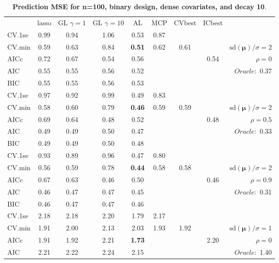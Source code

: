 \clearpage
\begin{table}\vspace{-.5cm}
\caption[l]{ { \bf Prediction MSE for n=100, binary design, 
dense covariates, and  decay  10}.}
\vspace{-.5cm}
\footnotesize{}
\begin{center}
\begin{tabular}{l*{7}{c}|r}
 & lasso & GL $\gamma=1$ & GL $\gamma=10$ & AL & MCP  & CVbest & ICbest  \\
\cline{1-9}
CV.1se & 0.99 & 0.94 & 1.06 & 0.53 & 0.87 & & & \\
CV.min & 0.59 & 0.63 & 0.84 & {\bf 0.51} & 0.62 & 0.61 & & $\mathrm{sd}(\mathbf{\mu})/\sigma=2$ \\
AICc & 0.72 & 0.67 & 0.54 & 0.56 & & & 0.54 &  $\rho=0$ \\
AIC & 0.55 & 0.55 & 0.56 & 0.52 & & & &  \multirow{2}{*}{$Oracle: $ 0.37} \\
BIC & 0.55 & 0.55 & 0.56 & 0.53 & & & &  \\
 \hline 
CV.1se & 0.97 & 0.92 & 0.99 & 0.49 & 0.83 & & & \\
CV.min & 0.58 & 0.60 & 0.79 & {\bf 0.46} & 0.59 & 0.59 & & $\mathrm{sd}(\mathbf{\mu})/\sigma=2$ \\
AICc & 0.69 & 0.64 & 0.48 & 0.52 & & & 0.48 &  $\rho=0.5$ \\
AIC & 0.49 & 0.49 & 0.50 & 0.47 & & & &  \multirow{2}{*}{$Oracle: $ 0.33} \\
BIC & 0.49 & 0.49 & 0.50 & 0.48 & & & &  \\
 \hline 
CV.1se & 0.93 & 0.89 & 0.96 & 0.47 & 0.80 & & & \\
CV.min & 0.56 & 0.59 & 0.78 & {\bf 0.44} & 0.58 & 0.58 & & $\mathrm{sd}(\mathbf{\mu})/\sigma=2$ \\
AICc & 0.67 & 0.63 & 0.46 & 0.50 & & & 0.46 &  $\rho=0.9$ \\
AIC & 0.46 & 0.47 & 0.47 & 0.45 & & & &  \multirow{2}{*}{$Oracle: $ 0.31} \\
BIC & 0.46 & 0.47 & 0.47 & 0.46 & & & &  \\
 \hline 
CV.1se & 2.18 & 2.18 & 2.20 & 1.79 & 2.17 & & & \\
CV.min & 1.91 & 2.00 & 2.13 & 2.03 & 1.93 & 1.92 & & $\mathrm{sd}(\mathbf{\mu})/\sigma=1$ \\
AICc & 1.91 & 1.92 & 2.21 & {\bf 1.73} & & & 2.20 &  $\rho=0$ \\
AIC & 2.21 & 2.22 & 2.24 & 2.15 & & & &  \multirow{2}{*}{$Oracle: $ 1.40} \\

\end{tabular}
\end{center}
\end{table}
